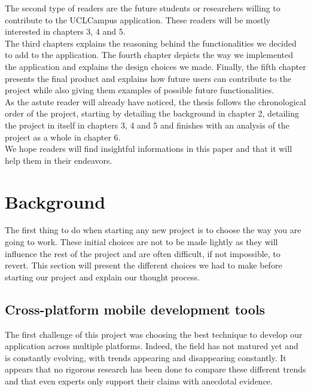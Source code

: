 \documentclass{eplmastersthesis}
\begin{document}
The second type of readers are the future students or researchers willing to contribute to the UCLCampus application. These readers will be mostly interested in chapters 3, 4 and 5.\\
The third chapters explains the reasoning behind the functionalities we decided to add to the application. The fourth chapter depicts the way we implemented the application and explains the design choices we made. Finally, the fifth chapter presents the final product  and explains how future users can contribute to the project while also giving them examples of possible future functionalities. \\

As the astute reader will already have noticed, the thesis follows the chronological order of the project, starting by detailing the background in chapter 2, detailing the project in itself in chapters 3, 4 and 5 and finishes with an analysis of the project as a whole in chapter 6.\\

We hope readers will find insightful informations in this paper and that it will help them in their endeavors.  



\chapter{Background}

The first thing to do when starting any new project is to choose the way you are going to work. These initial choices are not to be made lightly as they will influence the rest of the project and are often difficult, if not impossible, to revert. This section will present the different choices we had to make before starting our project and explain our thought process. 

\section{Cross-platform mobile development tools}

The first challenge of this project was choosing the best technique to develop our application across multiple platforms. Indeed, the field has not matured yet and is constantly evolving, with trends appearing and disappearing constantly. It appears that no rigorous research has been done to compare these different trends and that even experts only support their claims with anecdotal evidence.\\
\end{document}
